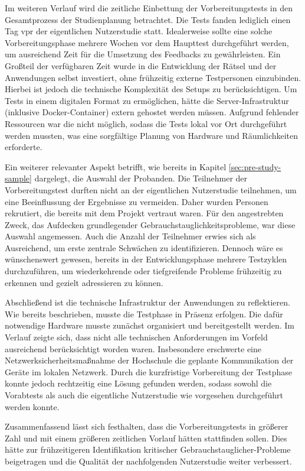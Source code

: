 Im weiteren Verlauf wird die zeitliche Einbettung der Vorbereitungstests in den Gesamtprozess der Studienplanung betrachtet. Die Tests fanden lediglich einen Tag vpr der eigentlichen Nutzerstudie statt. Idealerweise sollte eine solche Vorbereitungsphase mehrere Wochen vor dem Haupttest durchgeführt werden, um ausreichend Zeit für die Umsetzung des Feedbacks zu gewährleisten. Ein Großteil der verfügbaren Zeit wurde in die Entwicklung der Rätsel und der Anwendungen selbst investiert, ohne frühzeitig externe Testpersonen einzubinden. Hierbei ist jedoch die technische Komplexität des Setups zu berücksichtigen. Um Tests in einem digitalen Format zu ermöglichen, hätte die Server-Infrastruktur (inklusive Docker-Container) extern gehostet werden müssen. Aufgrund fehlender Ressourcen war die nicht möglich, sodass die Tests lokal vor Ort durchgeführt werden mussten, was eine sorgfältige Planung von Hardware und Räumlichkeiten erforderte.

Ein weiterer relevanter Aspekt betrifft, wie bereits in Kapitel \ref{sec:pre-study-sample} dargelegt, die Auswahl der Probanden. Die Teilnehmer der Vorbereitungstest durften nicht an der eigentlichen Nutzerstudie teilnehmen, um eine Beeinflussung der Ergebnisse zu vermeiden. Daher wurden Personen rekrutiert, die bereits mit dem Projekt vertraut waren. Für den angestrebten Zweck, das Aufdecken grundlegender Gebrauchstauglichkeitsprobleme, war diese Auswahl angemessen. Auch die Anzahl der Teilnehmer erwies sich als Ausreichend, um erste zentrale Schwächen zu identifizieren. Dennoch wäre es wünschenswert gewesen, bereits in der Entwicklungsphase mehrere Testzyklen durchzuführen, um wiederkehrende oder tiefgreifende Probleme frühzeitig zu erkennen und gezielt adressieren zu können.

Abschließend ist die technische Infrastruktur der Anwendungen zu reflektieren. Wie bereits beschrieben, musste die Testphase in Präsenz erfolgen. Die dafür notwendige Hardware musste zunächst organisiert und bereitgestellt werden. Im Verlauf zeigte sich, dass nicht alle technischen Anforderungen im Vorfeld ausreichend berücksichtigt worden waren. Insbesondere erschwerte eine Netzwerksicherheitsmaßnahme der Hochschule die geplante Kommunikation der Geräte im lokalen Netzwerk. Durch die kurzfristige Vorbereitung der Testphase konnte jedoch rechtzeitig eine Lösung gefunden werden, sodass sowohl die Vorabtests als auch die eigentliche Nutzerstudie wie vorgesehen durchgeführt werden konnte.

Zusammenfassend lässt sich festhalten, dass die Vorbereitungstests in größerer Zahl und mit einem größeren zeitlichen Vorlauf hätten stattfinden sollen. Dies hätte zur frühzeitigeren Identifikation kritischer Gebrauchstauglicher-Probleme beigetragen und die Qualität der nachfolgenden Nutzerstudie weiter verbessert.











